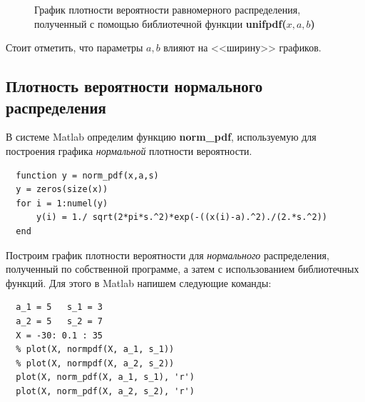 \begin{figure}[h]
\begin{minipage}[h]{0.47\linewidth}
    \caption{График плотности вероятности равномерного распределения, полученный с помощью библиотечной функции \textbf{unifpdf($x,a,b$)}}
  \end{minipage}
\end{figure}

Стоит отметить, что параметры $a, b$ влияют на <<ширину>> графиков.

\subsection{Плотность вероятности нормального распределения}

В системе Matlab определим функцию \textbf{norm\_pdf}, используемую для построения
графика \textit{нормальной} плотности вероятности.

\begin{lstlisting}
  function y = norm_pdf(x,a,s)
  y = zeros(size(x))
  for i = 1:numel(y)
      y(i) = 1./ sqrt(2*pi*s.^2)*exp(-((x(i)-a).^2)./(2.*s.^2))
  end
\end{lstlisting}

Построим график плотности вероятности для \textit{нормального} распределения,
полученный по собственной программе, а затем с использованием библиотечных функций.
Для этого в Matlab напишем следующие команды:

\begin{lstlisting}
  a_1 = 5   s_1 = 3
  a_2 = 5   s_2 = 7
  X = -30: 0.1 : 35
  % plot(X, normpdf(X, a_1, s_1))
  % plot(X, normpdf(X, a_2, s_2))
  plot(X, norm_pdf(X, a_1, s_1), 'r')
  plot(X, norm_pdf(X, a_2, s_2), 'r')
\end{lstlisting}

